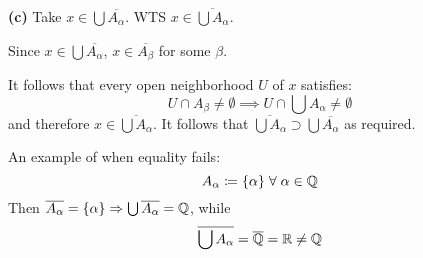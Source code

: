 \documentclass[a4paper, 12pt]{article}
\begin{document}
\begin{solution}
    \textbf{(c)} Take $x \in \bigcup \overline{A_\alpha}$. WTS $x \in \overline{\bigcup A_\alpha}$.

    Since $x \in \bigcup \overline{A_\alpha}$, $x \in \overline{A_\beta}$ for some $\beta$.

    It follows that every open neighborhood $U$ of $x$ satisfies: \begin{equation*}
    U \cap A_\beta \neq \emptyset \implies U \cap \bigcup A_\alpha \neq \emptyset
    \end{equation*}
    and therefore $x \in \overline{\bigcup A_\alpha}$. It follows that $\overline{\bigcup A_\alpha} \supset \bigcup \overline{A_\alpha}$ as required.

    An example of when equality fails:
    \begin{equation*}
    A_\alpha \coloneqq \{\alpha\} \forall \alpha \in \bbq
    \end{equation*}
    Then $\overline{A_\alpha} =\{ \alpha \}\Rightarrow \bigcup \overline{A_\alpha} = \mathbb{Q}$, while \begin{equation*}
    \overline{\bigcup A_\alpha} = \overline{\mathbb{Q}} = \mathbb{R} \neq \mathbb{Q}
    \end{equation*}
\end{solution}
\end{document}
